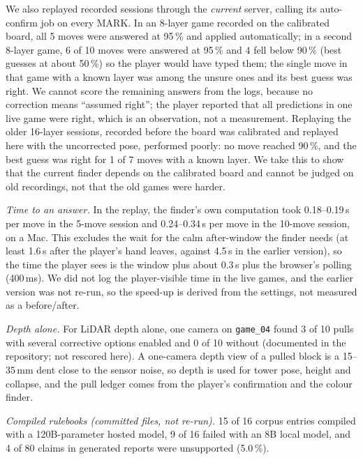 \documentclass[conference,10pt]{IEEEtran}
\newcommand{\code}[1]{\texttt{\small #1}}
\begin{document}
We also replayed recorded sessions through the \emph{current} server, calling its auto-confirm job on every MARK. In an 8-layer game recorded on the calibrated board, all 5 moves were answered at 95\,\% and applied automatically; in a second 8-layer game, 6 of 10 moves were answered at 95\,\% and 4 fell below 90\,\% (best guesses at about 50\,\%) so the player would have typed them; the single move in that game with a known layer was among the unsure ones and its best guess was right. We cannot score the remaining answers from the logs, because no correction means ``assumed right''; the player reported that all predictions in one live game were right, which is an observation, not a measurement. Replaying the older 16-layer sessions, recorded before the board was calibrated and replayed here with the uncorrected pose, performed poorly: no move reached 90\,\%, and the best guess was right for 1 of 7 moves with a known layer. We take this to show that the current finder depends on the calibrated board and cannot be judged on old recordings, not that the old games were harder.

\emph{Time to an answer.} In the replay, the finder's own computation took 0.18--0.19\,s per move in the 5-move session and 0.24--0.34\,s per move in the 10-move session, on a Mac. This excludes the wait for the calm after-window the finder needs (at least 1.6\,s after the player's hand leaves, against 4.5\,s in the earlier version), so the time the player sees is the window plus about 0.3\,s plus the browser's polling (400\,ms). We did not log the player-visible time in the live games, and the earlier version was not re-run, so the speed-up is derived from the settings, not measured as a before/after.

\emph{Depth alone.} For LiDAR depth alone, one camera on \code{game\_04} found 3 of 10 pulls with several corrective options enabled and 0 of 10 without (documented in the repository; not rescored here). A one-camera depth view of a pulled block is a 15--35\,mm dent close to the sensor noise, so depth is used for tower pose, height and collapse, and the pull ledger comes from the player's confirmation and the colour finder.

\emph{Compiled rulebooks (committed files, not re-run).} 15 of 16 corpus entries compiled with a 120B-parameter hosted model, 9 of 16 failed with an 8B local model, and 4 of 80 claims in generated reports were unsupported (5.0\,\%).
\end{document}
